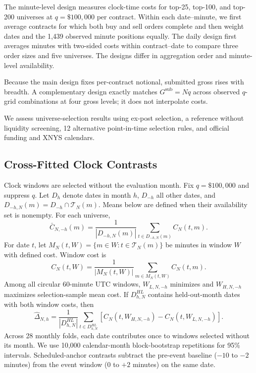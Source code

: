 \documentclass[sigconf]{acmart}
\begin{document}
The minute-level design measures clock-time costs for top-25, top-100, and top-200 universes at $q=\$100{,}000$ per contract. Within each date--minute, we first average contracts for which both buy and sell orders complete and then weight dates and the 1,439 observed minute positions equally. The daily design first averages minutes with two-sided costs within contract--date to compare three order sizes and five universes. The designs differ in aggregation order and minute-level availability.

Because the main design fixes per-contract notional, submitted gross rises with breadth. A complementary design exactly matches $G^{\mathrm{sub}}=Nq$ across observed $q$-grid combinations at four gross levels; it does not interpolate costs.

We assess universe-selection results using ex-post selection, a reference without liquidity screening, 12 alternative point-in-time selection rules, and official funding and XNYS calendars.

\subsection{Cross-Fitted Clock Contrasts}
Clock windows are selected without the evaluation month. Fix $q=\$100{,}000$ and suppress $q$. Let $D_h$ denote dates in month $h$, $D_{-h}$ all other dates, and $D_{-h,N}(m)=D_{-h}\cap\mathcal T_N(m)$. Means below are defined when their availability set is nonempty. For each universe,
\begin{equation}
\bar C_{N,-h}(m)=\frac{1}{|D_{-h,N}(m)|}
\sum_{t\in D_{-h,N}(m)}C_N(t,m).
\end{equation}
For date $t$, let $M_N(t,W)=\{m\in W:t\in\mathcal T_N(m)\}$ be minutes in window $W$ with defined cost. Window cost is
\begin{equation}
C_N(t,W)=\frac{1}{|M_N(t,W)|}
\sum_{m\in M_N(t,W)}C_N(t,m).
\end{equation}
Among all circular 60-minute UTC windows, $W_{L,N,-h}$ minimizes and $W_{H,N,-h}$ maximizes selection-sample mean cost. If $D^{HL}_{h,N}$ contains held-out-month dates with both window costs, then
\begin{equation}
\widehat\Delta_{N,h}=\frac{1}{|D^{HL}_{h,N}|}
\sum_{t\in D^{HL}_{h,N}}
[C_N(t,W_{H,N,-h})-C_N(t,W_{L,N,-h})].
\end{equation}
Across 28 monthly folds, each date contributes once to windows selected without its month. We use 10,000 calendar-month block-bootstrap repetitions for 95\% intervals. Scheduled-anchor contrasts subtract the pre-event baseline ($-10$ to $-2$ minutes) from the event window (0 to $+2$ minutes) on the same date.
\end{document}
